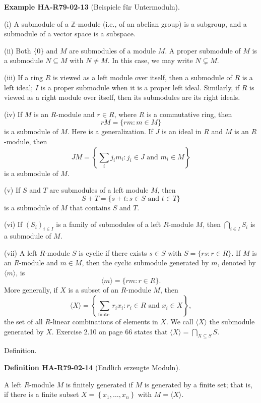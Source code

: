 \documentclass[10pt, letterpaper]{article}
\newcommand{\CustomHeading}[3]{%
  \par\medskip\noindent%
  \textbf{#1 #2} \textnormal{(#3)}.\enskip%
}
\newenvironment{DEF}[2]{\begin{unitbox}\CustomHeading{Definition}{#1}{#2}}{\end{unitbox}}
\newenvironment{EXA}[2]{\begin{unitbox}\CustomHeading{Example}{#1}{#2}}{\end{unitbox}}
\begin{document}
\begin{EXA}{HA-R79-02-13}{Beispiele für Untermoduln}
(i) A submodule of a $\mathbb{Z}$-module (i.e., of an abelian group) is a subgroup, and a submodule of a vector space is a subspace.

(ii) Both $\{0\}$ and $M$ are submodules of a module $M$. A proper submodule of $M$ is a submodule $N \subseteq M$ with $N \neq M$. In this case, we may write $N \subsetneq M$.

(iii) If a ring $R$ is viewed as a left module over itself, then a submodule of $R$ is a left ideal; $I$ is a proper submodule when it is a proper left ideal. Similarly, if $R$ is viewed as a right module over itself, then its submodules are its right ideals.

(iv) If $M$ is an $R$-module and $r \in R$, where $R$ is a commutative ring, then
$$
r M=\{r m: m \in M\}
$$
is a submodule of $M$. Here is a generalization. If $J$ is an ideal in $R$ and $M$ is an $R$-module, then
$$
J M=\left\{\sum_{i} j_{i} m_{i}: j_{i} \in J \text { and } m_{i} \in M\right\}
$$
is a submodule of $M$.


(v) If $S$ and $T$ are submodules of a left module $M$, then
$$
S+T=\{s+t: s \in S \text { and } t \in T\}
$$
is a submodule of $M$ that contains $S$ and $T$.


(vi) If $\left(S_{i}\right)_{i \in I}$ is a family of submodules of a left $R$-module $M$, then $\bigcap_{i \in I} S_{i}$ is a submodule of $M$.


(vii) A left $R$-module $S$ is cyclic if there exists $s \in S$ with $S=\{r s: r \in R\}$. If $M$ is an $R$-module and $m \in M$, then the cyclic submodule generated by $m$, denoted by $\langle m\rangle$, is
$$
\langle m\rangle=\{r m: r \in R\} .
$$
More generally, if $X$ is a subset of an $R$-module $M$, then
$$
\langle X\rangle=\left\{\sum_{\text {finite }} r_{i} x_{i}: r_{i} \in R \text { and } x_{i} \in X\right\},
$$
the set of all $R$-linear combinations of elements in $X$. We call $\langle X\rangle$ the submodule generated by $X$. Exercise 2.10 on page 66 states that $\langle X\rangle=\bigcap_{X \subseteq S} S$.
\end{EXA}



Definition. 


\begin{DEF}{HA-R79-02-14}{Endlich erzeugte Moduln}
A left $R$-module $M$ is finitely generated if $M$ is generated by a finite set; that is, if there is a finite subset $X=\left\{x_{1}, \ldots, x_{n}\right\}$ with $M=\langle X\rangle$.
\end{DEF}
\end{document}
